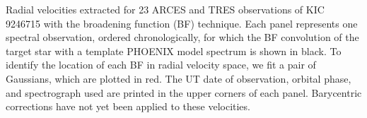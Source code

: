 \label{fig:bffig} Radial velocities extracted for 23 ARCES and TRES observations of KIC 9246715 with the broadening function (BF) technique. Each panel represents one spectral observation, ordered chronologically, for which the BF convolution of the target star with a template PHOENIX model spectrum is shown in black. To identify the location of each BF in radial velocity space, we fit a pair of Gaussians, which are plotted in red. The UT date of observation, orbital phase, and spectrograph used are printed in the upper corners of each panel. Barycentric corrections have not yet been applied to these velocities.